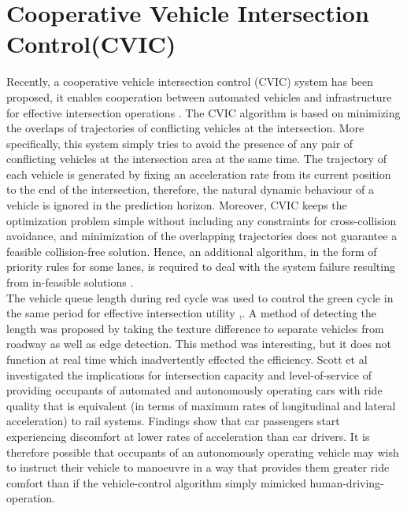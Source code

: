 \documentclass{book}
\begin{document}
\section{Cooperative Vehicle Intersection Control(CVIC)}
Recently, a cooperative vehicle intersection control (CVIC) system has been proposed, it enables cooperation between automated vehicles and infrastructure for effective intersection operations \cite{lee2012development}. The CVIC algorithm is based on minimizing the overlaps of trajectories of conflicting vehicles at the intersection. More specifically, this system simply tries to avoid the presence of any pair of conflicting vehicles at the intersection
area at the same time. The trajectory of each vehicle is generated by fixing an acceleration rate from its current position to the end of the intersection, therefore, the natural dynamic behaviour of a vehicle is ignored in the prediction horizon. Moreover, CVIC keeps the optimization problem simple without including any constraints for cross-collision avoidance, and minimization of the overlapping trajectories does not guarantee
a feasible collision-free solution. Hence, an additional algorithm, in the form of priority rules for some lanes, is required to deal with the system failure resulting from in-feasible solutions \cite{kamal2013coordination}. \\


The vehicle queue length during red cycle was used to control the green cycle in the same period for effective intersection utility \cite{cai2010measurement,altenburg2008breakthrough, wang2006new},. A method of detecting the length was proposed by taking the texture difference to separate vehicles from roadway as well as edge detection. This method was interesting, but it does not function at real time which inadvertently effected the efficiency. Scott et al\cite{levine2018simulation} investigated the implications for intersection capacity and level-of-service of providing occupants of automated and autonomously operating cars with ride quality that is equivalent (in terms of maximum rates of longitudinal and lateral acceleration) to rail systems. Findings show that car passengers start experiencing discomfort at lower rates of acceleration than car drivers\cite{le2015autonomous,regulations2014california,balaguru2014frp,jin2014dynamics}. It is therefore possible that occupants of an autonomously operating vehicle may wish to instruct their vehicle to manoeuvre in a way that provides them greater ride comfort than if the vehicle-control algorithm simply mimicked human-driving-operation. \\
\end{document}

